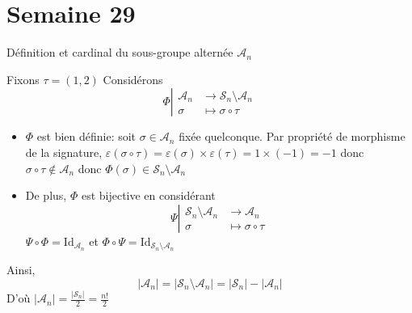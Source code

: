 \documentclass{article}
\renewenvironment{question_kholle}[2][ ]
{
	\subsection{\texorpdfstring{#2}{}}
	\notblank{#1}
	{
		\noindent #1
		\bigbreak
	}
	{}
	\begin{proof}
}
{
	\end{proof}
}
\begin{document}
\pagebreak\section{Semaine 29}

\begin{question_kholle}[{Le noyau d'un morphisme de groupe étant toujours un sous-groupe du groupe de départ, le groupe alterné d'indice $n \in \N^{*}$ est le sous groupe de $(\mathcal{S}_{n}, \circ)$ obtenu en considérant le noyau du morphisme signature.
    $$
    \mathcal{A}_{n}= \ker \varepsilon
    $$
    $\mathcal{A}_{n}$ est de cardinal $\frac{n!}{2}$
    }]{Définition et cardinal du sous-groupe alternée $\mathcal{A}_n$}
    
    
    Fixons $\tau = (1, 2)$
    Considérons
    $$\Phi \left|\begin{array}{ll} \mathcal{A}_{n} &\to \mathcal{S}_{n} \setminus \mathcal{A}_{n} \\ \sigma &\mapsto \sigma \circ \tau \end{array}\right.$$
    \begin{itemize}
        \item 
        
        $\Phi$ est bien définie: soit $\sigma \in \mathcal{A}_{n}$ fixée quelconque. Par propriété de morphisme de la signature, $\varepsilon(\sigma \circ \tau) = \varepsilon(\sigma) \times \varepsilon(\tau) = 1 \times (-1) = -1$ donc $\sigma \circ \tau \not\in \mathcal{A}_{n}$ donc $\Phi(\sigma) \in \mathcal{S}_{n}\setminus \mathcal{A}_{n}$
        
        \item De plus, $\Phi$ est bijective en considérant 
$$\Psi\left|\begin{array}{ll} \mathcal{S}_{n}\setminus \mathcal{A}_{n} &\to \mathcal{A}_{n} \\ \sigma &\mapsto \sigma \circ  \tau \end{array}\right.$$
$\Psi \circ \Phi = \mathrm{Id}_{\mathcal{A}_{n}}$ et $\Phi \circ \Psi = \mathrm{Id}_{\mathcal{S}_{n}\setminus \mathcal{A}_{n}}$
    \end{itemize}
    Ainsi,
$$
    \lvert \mathcal{A}_{n} \rvert  = \lvert \mathcal{S}_{n}\setminus \mathcal{A}_{n} \rvert  = \lvert \mathcal{S}_{n} \rvert - \lvert \mathcal{A}_{n} \rvert 
$$
    D'où $\lvert \mathcal{A}_{n} \rvert = \frac{\lvert \mathcal{S}_{n} \rvert}{2} = \frac{n!}{2}$
\end{question_kholle}
\end{document}
